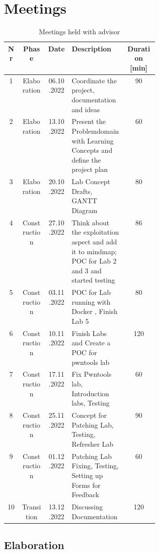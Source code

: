 \chapter{Meetings}
\label{meeting_chapter}

\begin{table}[H]
    \centering
    \begin{tabular}{| c | c | c | p{0.36\linewidth} | c |}
        \hline 
        Nr & Phase & Date & Description & Duration [min]\\
        \hline \hline
        1 & Elaboration & 06.10.2022 & Coordinate the project, documentation \- and ideas & 90\\
        \hline
        2 & Elaboration & 13.10.2022 & Present the Problemdomain with Learning Concepts and define the project plan & 60 \\
        \hline
        3 & Elaboration & 20.10.2022 & Lab Concept Drafts, GANTT Diagram & 80 \\
        \hline
        4 & Construction & 27.10.2022 & Think about the exploitation aspect and add it to mindmap; POC for Lab 2 and 3 and started testing & 86\\
        \hline
        5 & Construction & 03.11.2022 & POC for Lab running with Docker , Finish Lab 5 & 80 \\
        \hline
        6 & Construction & 10.11.2022 & Finish Labs and Create a POC for pwntools lab & 120 \\
        \hline
        7 & Construction & 17.11.2022 & Fix Pwntools lab, Introduction labs, Testing & 60 \\
        \hline
        8 & Construction & 25.11.2022 & Concept for Patching Lab, Testing, Refresher Lab & 90 \\
        \hline
        9 & Construction & 01.12.2022 & Patching Lab Fixing, Testing, Setting up Forms for Feedback & 60 \\
        \hline
        10 & Transition & 13.12.2022 & Discussing Documentation & 120 \\
        \hline
    \end{tabular}
    \caption{Meetings held with advisor}
    \label{meetings_hold_table}
\end{table}
\section{Elaboration}

